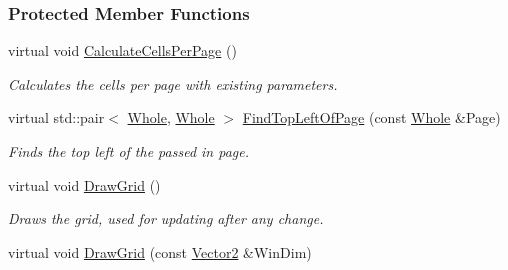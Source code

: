 \subsubsection*{Protected Member Functions}
\begin{DoxyCompactItemize}
\item 
\hypertarget{classphys_1_1UI_1_1PagedCellGrid_a635b2821bf9876a21d91da749ec9db79}{
virtual void \hyperlink{classphys_1_1UI_1_1PagedCellGrid_a635b2821bf9876a21d91da749ec9db79}{CalculateCellsPerPage} ()}
\label{classphys_1_1UI_1_1PagedCellGrid_a635b2821bf9876a21d91da749ec9db79}

\begin{DoxyCompactList}\small\item\em Calculates the cells per page with existing parameters. \item\end{DoxyCompactList}\item 
\hypertarget{classphys_1_1UI_1_1PagedCellGrid_aed3d35d22a9282d7603cd6f5ed0d7f1c}{
virtual std::pair$<$ \hyperlink{namespacephys_a460f6bc24c8dd347b05e0366ae34f34a}{Whole}, \hyperlink{namespacephys_a460f6bc24c8dd347b05e0366ae34f34a}{Whole} $>$ \hyperlink{classphys_1_1UI_1_1PagedCellGrid_aed3d35d22a9282d7603cd6f5ed0d7f1c}{FindTopLeftOfPage} (const \hyperlink{namespacephys_a460f6bc24c8dd347b05e0366ae34f34a}{Whole} \&Page)}
\label{classphys_1_1UI_1_1PagedCellGrid_aed3d35d22a9282d7603cd6f5ed0d7f1c}

\begin{DoxyCompactList}\small\item\em Finds the top left of the passed in page. \item\end{DoxyCompactList}\item 
\hypertarget{classphys_1_1UI_1_1PagedCellGrid_a9eb862a9e31767dd02bf8cf03178392e}{
virtual void \hyperlink{classphys_1_1UI_1_1PagedCellGrid_a9eb862a9e31767dd02bf8cf03178392e}{DrawGrid} ()}
\label{classphys_1_1UI_1_1PagedCellGrid_a9eb862a9e31767dd02bf8cf03178392e}

\begin{DoxyCompactList}\small\item\em Draws the grid, used for updating after any change. \item\end{DoxyCompactList}\item 
\hypertarget{classphys_1_1UI_1_1PagedCellGrid_a85dedc7f0ed0a387b58486350a9c40a7}{
virtual void \hyperlink{classphys_1_1UI_1_1PagedCellGrid_a85dedc7f0ed0a387b58486350a9c40a7}{DrawGrid} (const \hyperlink{classphys_1_1Vector2}{Vector2} \&WinDim)}
\label{classphys_1_1UI_1_1PagedCellGrid_a85dedc7f0ed0a387b58486350a9c40a7}


\end{DoxyCompactItemize}
